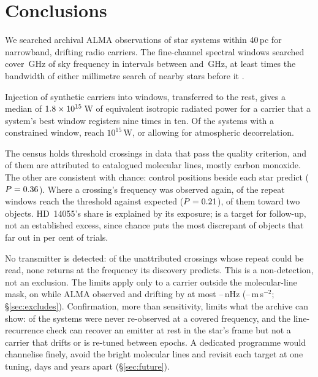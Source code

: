 \section{Conclusions}
\label{sec:conclusions}

We searched archival ALMA observations of \NSysClassA{} star systems within
40\,pc for narrowband, drifting radio carriers. The fine-channel spectral
windows searched cover \CvUnionA\,GHz of sky frequency in \CovNIslands{}
intervals between \SurvFreqLoA{} and \SurvFreqHiA\,GHz, at least
\SbPriorRatio{} times the bandwidth of either millimetre search of
nearby stars before it \citep{Steffes1994,Mauersberger1996}.

Injection of synthetic carriers into \SensNInj{} windows, transferred to the
rest, gives a median of $1.8\times10^{15}$\,W of equivalent isotropic
radiated power for a carrier that a system's best window registers nine times
in ten. Of the \NSysALim{} systems with a constrained window, \NSysEfifteen{}
reach $10^{15}$\,W, or \NmDecAdjNEfifteen{} allowing for atmospheric
decorrelation.

The census holds \CsNCrossQp{} threshold crossings in data that pass the
quality criterion, and \CsNAttrQp{} of them are attributed to catalogued
molecular lines, mostly carbon monoxide. The other \CsNUnattrQp{} are
consistent with chance: control positions beside
each star predict \CeExp{} ($P=0.36$). Where a crossing's frequency was
observed again, \WuNWinExc{} of the \WuNWin{} repeat windows reach the
threshold against \WuExpWin{} expected ($P=0.21$), \TwNWinExcTwoWord{} of
them toward two objects. HD~14055's share is explained by its exposure;
\BkAlmaName{} is a target for follow-up, not an established excess, since
chance puts the most discrepant of \TwLookNStar{} objects that far out in
\TwLookPct{} per cent of trials.

No transmitter is detected: of the unattributed crossings whose repeat could
be read, none returns at the frequency its discovery predicts. This is a non-detection,
not an exclusion. The limits apply only to a carrier outside the
molecular-line mask, on while ALMA observed and drifting by at most
\DriftCeilLo--\DriftCeilHi\,nHz (\AccelCeilMed--\AccelCeilMax\,m\,s$^{-2}$;
\S\ref{sec:excludes}). Confirmation, more than sensitivity, limits what the archive can show:
\ZcNoRepSys{} of the \NSysClassA{} systems were never re-observed at a covered
frequency, and the line-recurrence check can recover an emitter at rest in
the star's frame but not a carrier that drifts or is re-tuned between epochs. A dedicated
programme would channelise finely, avoid the bright molecular lines and
revisit each target at one tuning, days and years apart (\S\ref{sec:future}).
